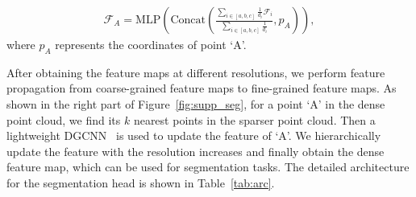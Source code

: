 \documentclass[10pt,twocolumn,letterpaper]{article}
\begin{document}
\begin{appendix}
\begin{equation}
    \begin{split}
        \mathcal{F}_A = \text{MLP} (\text{Concat}(\frac{\sum_{i \in [a,b,c]} \frac{1}{d_i} \mathcal{F}_{i}}{\sum_{i \in [a,b,c]} \frac{1}{d_i}}, p_A)), 
    \end{split}
\end{equation}
\noindent where $p_A$ represents the coordinates of point `A'.

After obtaining the feature maps at different resolutions, we perform feature propagation from coarse-grained feature maps to fine-grained feature maps. As shown in the right part of Figure~\ref{fig:supp_seg}, for a point `A' in the dense point cloud, we find its $k$ nearest points in the sparser point cloud. Then a lightweight DGCNN~\cite{wang2019dynamic} is used to update the feature of `A'. We hierarchically update the feature with the resolution increases and finally obtain the dense feature map, which can be used for segmentation tasks. The detailed architecture for the segmentation head is shown in Table~\ref{tab:arc}. 

\end{appendix}
	
\end{document}
